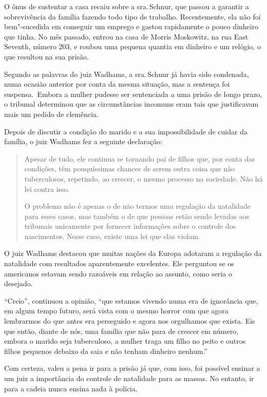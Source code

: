 O ônus de sustentar a casa recaiu sobre a sra.\,Schnur, que passou a
garantir a sobrevivência da família fazendo todo tipo de trabalho.
Recentemente, ela não foi bem"-sucedida em conseguir um emprego e gastou
rapidamente o pouco dinheiro que tinha. No mês passado, entrou na casa
de Morris Moskowitz, na rua East Seventh, número 203, e roubou uma
pequena quantia em dinheiro e um relógio, o que resultou na sua prisão.

Segundo as palavras do juiz Wadhams, a sra.\,Schnur já havia sido condenada,
numa ocasião anterior por conta da mesma situação, mas
a sentença foi suspensa.~Embora a mulher pudesse ser sentenciada a
uma prisão de longo prazo, o tribunal determinou que as circunstâncias
incomuns eram tais que justificavam mais um pedido de clemência.

Depois de discutir a condição do marido e a sua impossibilidade de cuidar
da família, o juiz Wadhams fez a seguinte declaração:

\begin{quote}
Apesar de tudo, ele continua se tornando pai de filhos que, por conta
das condições, têm pouquíssimas chances de serem outra coisa que não
tuberculosos, repetindo, ao crescer, o mesmo processo na sociedade. Não
há lei contra isso.

O problema não é apenas o de não termos uma regulação da natalidade
para esses casos, mas também o de que pessoas estão sendo levadas aos
tribunais unicamente por fornecer informações sobre o controle dos nascimentos.
Nesse caso, existe uma lei que elas violam.
\end{quote}

O juiz Wadhams destacou que muitas nações da Europa adotaram a regulação
da natalidade com resultados aparentemente excelentes. Ele perguntou se
os americanos estavam sendo razoáveis em relação ao assunto, como seria
o desejado.

``Creio'', continuou a opinião, ``que estamos vivendo numa era de
ignorância que, em algum tempo futuro, será vista com o mesmo horror com
que agora lembrarmos do que antes era perseguido e agora nos orgulhamos
que exista. Eis que então, diante de nós, uma família que não para de
crescer em número, embora o marido seja tuberculoso, a mulher traga um
filho no peito e outros filhos pequenos debaixo da saia e não tenham
dinheiro nenhum.''

Com certeza, valeu a pena ir para a prisão já que, com isso, foi
possível ensinar a um juiz a importância do controle de natalidade para
as massas. No entanto, ir para a cadeia nunca ensina nada à polícia.

